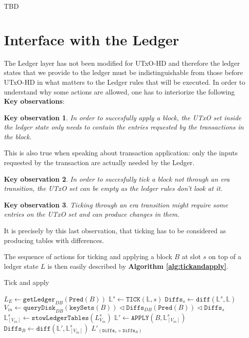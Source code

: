 \documentclass[11pt,a4paper]{article}
\theoremstyle{definition}
\newtheorem{observation}{Key observation}
\begin{document}
TBD

\section{Interface with the Ledger}

The Ledger layer has not been modified for UTxO-HD and therefore the ledger
states that we provide to the ledger must be indistinguishable from those before
UTxO-HD in what matters to the Ledger rules that will be executed. In order to
understand why some actions are allowed, one has to interiorize the following
\textbf{Key observations}:

\begin{observation}
  \emph{In order to succesfully apply a block, the UTxO set inside the ledger state
  only needs to contain the entries requested by the transactions in the block.}
\end{observation}

This is also true when speaking about transaction application: only the inputs
requested by the transaction are actually needed by the Ledger.

\begin{observation}
  \emph{In order to succesfully tick a block not through an era transition, the
    UTxO set can be empty as the ledger rules don't look at it.}
\end{observation}

\begin{observation}
  \emph{Ticking through an era transition might require some entries on the UTxO set
  and can produce changes in them.}
\end{observation}

It is precisely by this last observation, that ticking has to be considered as
producing tables with differences.

The sequence of actions for ticking and applying a block $B$ at slot $s$ on top
of a ledger state $L$ is then easily described by \textbf{Algorithm \ref{alg:tickandapply}}.

\begin{algorithm}[h]
  \caption{Tick and apply}
  \label{alg:tickandapply}
  \begin{algorithmic}[1]
    \State $L_{E} \gets \texttt{getLedger}_{DB}(\texttt{Pred}(B))$
    \State $\mathbb{L}^{s} \gets \texttt{TICK}(\mathbb{L}, s)$ 
    \State $\texttt{Diffs}_{s} \gets \texttt{diff}(\mathbb{L}^{s}, \mathbb{L})$
    \Statex
    \State $V_{in} \gets \texttt{queryDisk}_{DB}(\texttt{keySets}(B)) \triangleleft \texttt{Diffs}_{DB}(\texttt{Pred}(B)) \triangleleft \texttt{Diffs}_{s}$ 
    \Statex
    \State $\mathbb{L}^{s}_{[V_{in}]} \gets \texttt{stowLedgerTables}(L^{s}_{{V_{in}}})$
    \State $\mathbb{L}' \gets \texttt{APPLY}(B, \mathbb{L}^{s}_{[V_{in}]})$
    \State $\texttt{Diffs}_{B} \gets \texttt{diff}(\mathbb{L}', \mathbb{L}^{s}_{[V_{in}]})$
    \Statex{}
    \State \Return $L'_{(\texttt{Diffs}_{s}~\diamond~\texttt{Diffs}_{B})}$
    \EndProcedure
 \end{algorithmic}
\end{algorithm}
\end{document}
